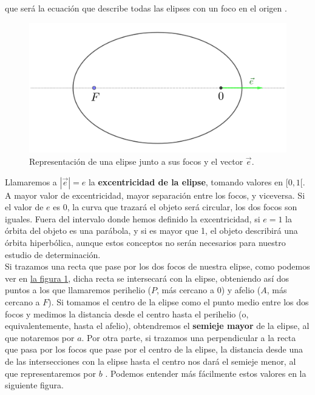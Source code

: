 \noindent que será la ecuación que describe todas las elipses con un foco en el origen \cite{mecanica_celeste}.\\

\begin{figure}[H]
\centering
\includegraphics[scale=0.12]{images/elipse_excentricidad.png}
\caption{Representación de una elipse junto a sus focos y el vector $\vec{e}$.}
\label{fig:elipse_excentricidad}
\end{figure}

Llamaremos a $|\vec{e}|=e$ la \textbf{excentricidad de la elipse}, tomando valores en $[0,1[$. A mayor valor de excentricidad, mayor separación entre los focos, y viceversa. Si el valor de $e$ es 0, la curva que trazará el objeto será circular, los dos focos son iguales. Fuera del intervalo donde hemos definido la excentricidad, si $e=1$ la órbita del objeto es una parábola, y si es mayor que 1, el objeto describirá una órbita hiperbólica, aunque estos conceptos no serán necesarios para nuestro estudio de determinación.\\

Si trazamos una recta que pase por los dos focos de nuestra elipse, como podemos ver en \hyperref[fig:elipse_excentricidad]{la figura \ref{fig:elipse_excentricidad}}, dicha recta se intersecará con la elipse, obteniendo así dos puntos a los que llamaremos perihelio ($P$, más cercano a $0$) y afelio ($A$, más cercano a $F$). Si tomamos el centro de la elipse como el punto medio entre los dos focos y medimos la distancia desde el centro hasta el perihelio (o, equivalentemente, hasta el afelio), obtendremos el \textbf{semieje mayor} de la elipse, al que notaremos por $a$. Por otra parte, si trazamos una perpendicular a la recta que pasa por los focos que pase por el centro de la elipse, la distancia desde una de las intersecciones con la elipse hasta el centro nos dará el semieje menor, al que representaremos por $b$ \cite{ortega}. Podemos entender más fácilmente estos valores en la siguiente figura.

